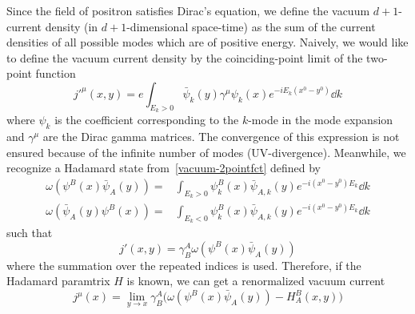 Since the field of positron satisfies Dirac's equation, 
we define the vacuum $d+1$-current density (in $d+1$-dimensional space-time) as the sum of the current densities of all possible modes which are of positive energy. 
Naively, we would like to define the vacuum current density by the coinciding-point limit of the two-point function
\begin{equation}\label{vacuum-2pointfct}
j'^{\mu}(x,y) =  e \int_{E_k > 0} \bar{\psi}_k(y)\gamma^\mu \psi_k(x) e^{- i E_k(x^0 - y^0)} \dd k
\end{equation}
where $\psi_k$ is the coefficient corresponding to the $k$-mode in the mode expansion and $\gamma^\mu$ are the Dirac gamma matrices.
The convergence of this expression is not ensured because of the infinite number of modes (UV-divergence).
Meanwhile, we recognize a Hadamard state from~\cref{vacuum-2pointfct} defined by 
\begin{equation*}
\begin{split}
\omega(\psi^B(x)\bar{\psi}_A(y)) = & \int_{E_k >0} \psi_k^B(x)\bar{\psi}_{A,k}(y)e^{-i(x^0-y^0)E_k} \dd k \\
\omega(\bar{\psi}_A(y)\psi^B(x)) = & \int_{E_k <0} \psi_k^B(x)\bar{\psi}_{A,k}(y)e^{-i(x^0-y^0)E_k} \dd k 
\end{split}
\end{equation*}
such that 
\begin{equation*}
j'(x,y) = \gamma^A_B \omega(\psi^B(x)\bar{\psi}_A(y)) 
\end{equation*}
where the summation over the repeated indices is used.
Therefore, if the Hadamard paramtrix $H$ is known, we can get a renormalized vacuum current
\begin{equation}\label{vacuum-currentexpression}
j^\mu(x) = \lim_{y \rightarrow x} \gamma^A_B \big(
\omega(\psi^B(x)\bar{\psi}_A(y)) - H^B_A (x, y)\big)
\end{equation}
%
